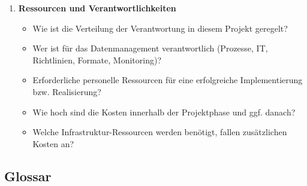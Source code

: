 \begin{enumerate}[start=0, label=\textbf{\arabic*})]
\begin{itemize}
          \item Wo (Datenrepositorium, Datenzeitschrift) werden die Daten
                veröffentlicht und wie (z.B. Open Access, mit Sperrfrist,
                beschränkter Zugang)?
          \item Wie lauten die Lizenzbedingungen für die veröffentlichten Daten?
               (z. B. "CC BY 4.0")
        \end{itemize}
  \item \textbf{Ressourcen und Verantwortlichkeiten}
        \begin{itemize}
          \item Wie ist die Verteilung der Verantwortung in diesem Projekt
                geregelt?
          \item Wer ist für das Datenmanagement verantwortlich (Prozesse, IT,
                Richtlinien, Formate, Monitoring)?
          \item Erforderliche personelle Ressourcen für eine erfolgreiche
                Implementierung bzw. Realisierung?
          \item Wie hoch sind die Kosten innerhalb der Projektphase und ggf.
                danach?
          \item Welche Infrastruktur-Ressourcen werden benötigt, fallen
                zusätzlichen Kosten an?
        \end{itemize}
\end{enumerate}




\pagebreak
\subsection{Glossar}

